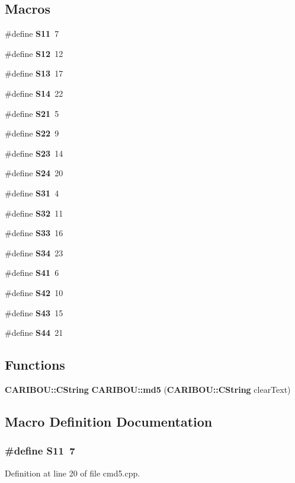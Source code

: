 \subsection*{Macros}
\begin{DoxyCompactItemize}
\item 
\#define {\bf S11}~7
\item 
\#define {\bf S12}~12
\item 
\#define {\bf S13}~17
\item 
\#define {\bf S14}~22
\item 
\#define {\bf S21}~5
\item 
\#define {\bf S22}~9
\item 
\#define {\bf S23}~14
\item 
\#define {\bf S24}~20
\item 
\#define {\bf S31}~4
\item 
\#define {\bf S32}~11
\item 
\#define {\bf S33}~16
\item 
\#define {\bf S34}~23
\item 
\#define {\bf S41}~6
\item 
\#define {\bf S42}~10
\item 
\#define {\bf S43}~15
\item 
\#define {\bf S44}~21
\end{DoxyCompactItemize}
\subsection*{Functions}
\begin{DoxyCompactItemize}
\item 
{\bf C\-A\-R\-I\-B\-O\-U\-::\-C\-String} {\bf C\-A\-R\-I\-B\-O\-U\-::md5} ({\bf C\-A\-R\-I\-B\-O\-U\-::\-C\-String} clear\-Text)
\end{DoxyCompactItemize}


\subsection{Macro Definition Documentation}
\subsubsection[{S11}]{\setlength{\rightskip}{0pt plus 5cm}\#define S11~7}\label{cmd5_8cpp_a51398c0e5541164ad4d6615880073305}


Definition at line 20 of file cmd5.\-cpp.

